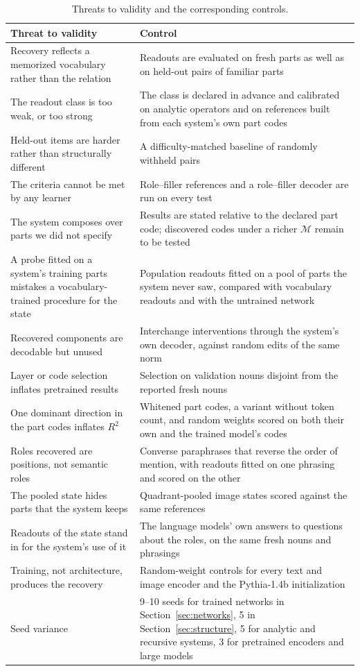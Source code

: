 \documentclass[10pt]{article}
\theoremstyle{plain}
\theoremstyle{remark}
\newcommand{\M}{\mathcal{M}}
\begin{document}
\begin{table}[h]
  \caption{Threats to validity and the corresponding controls.}
  \label{tab:controls}
  \centering\small
  \begin{tabularx}{\linewidth}{@{}YY@{}}
    \toprule
    Threat to validity & Control \\
    \midrule
    Recovery reflects a memorized vocabulary rather than the relation & Readouts are evaluated on fresh parts as well as on held-out pairs of familiar parts \\
    The readout class is too weak, or too strong & The class is declared in advance and calibrated on analytic operators and on references built from each system's own part codes \\
    Held-out items are harder rather than structurally different & A difficulty-matched baseline of randomly withheld pairs \\
    The criteria cannot be met by any learner & Role--filler references and a role--filler decoder are run on every test \\
    The system composes over parts we did not specify & Results are stated relative to the declared part code; discovered codes under a richer $\M$ remain to be tested \\
    A probe fitted on a system's training parts mistakes a vocabulary-trained procedure for the state & Population readouts fitted on a pool of parts the system never saw, compared with vocabulary readouts and with the untrained network \\
    Recovered components are decodable but unused & Interchange interventions through the system's own decoder, against random edits of the same norm \\
    Layer or code selection inflates pretrained results & Selection on validation nouns disjoint from the reported fresh nouns \\
    One dominant direction in the part codes inflates $R^2$ & Whitened part codes, a variant without token count, and random weights scored on both their own and the trained model's codes \\
    Roles recovered are positions, not semantic roles & Converse paraphrases that reverse the order of mention, with readouts fitted on one phrasing and scored on the other \\
    The pooled state hides parts that the system keeps & Quadrant-pooled image states scored against the same references \\
    Readouts of the state stand in for the system's use of it & The language models' own answers to questions about the roles, on the same fresh nouns and phrasings \\
    Training, not architecture, produces the recovery & Random-weight controls for every text and image encoder and the Pythia-1.4b initialization \\
    Seed variance & 9--10 seeds for trained networks in Section~\ref{sec:networks}, 5 in Section~\ref{sec:structure}, 5 for analytic and recursive systems, 3 for pretrained encoders and large models \\
    \bottomrule
  \end{tabularx}
\end{table}
\end{document}
